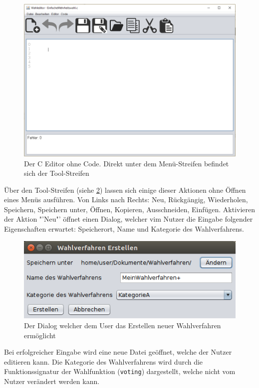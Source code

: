 \documentclass[a4paper]{scrreprt}
\begin{document}
\begin{figure}[H]
\includegraphics[scale=0.5]{Editor-ohne-text.png}
\caption{Der C Editor ohne Code. Direkt unter dem Menü-Streifen befindet sich der Tool-Streifen}
\label{C-Editor-Tool-Streifen}
\end{figure}

Über den Tool-Streifen (siehe \ref{C-Editor-Tool-Streifen}) lassen sich einige dieser Aktionen ohne Öffnen eines Menüs ausführen. Von Links nach Rechts: Neu, Rückgängig, Wiederholen, Speichern, Speichern unter, Öffnen, Kopieren, Ausschneiden, Einfügen. Aktivieren der Aktion "'Neu"' öffnet einen Dialog, welcher vim Nutzer die Eingabe folgender Eigenschaften erwartet: Speicherort, Name und Kategorie des Wahlverfahrens.

\begin{figure}[H]
\includegraphics[scale=0.5]{Wahlverfahren-Erstellen.png}
\caption{Der Dialog welcher dem User das Erstellen neuer Wahlverfahren ermöglicht}
\label{C-Editor-Tool-Streifen}
\end{figure}

Bei erfolgreicher Eingabe wird eine neue Datei geöffnet, welche der Nutzer editieren kann. Die Kategorie des Wahlverfahrens wird durch die Funktionssignatur der Wahlfunktion (\texttt{voting}) dargestellt, welche nicht vom Nutzer verändert werden kann. 
\end{document}

